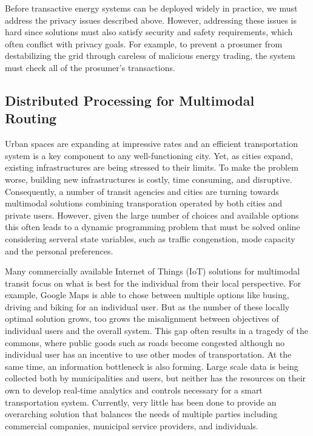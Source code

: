 \documentclass[12pt,letterpaper]{article}
\begin{document}
Before transactive energy systems can be deployed widely in practice,
we must address the privacy issues described above. However, addressing these
issues is hard since solutions must also satisfy security
and safety requirements, which often conflict with privacy goals.  For
example, to prevent a prosumer from destabilizing the grid through
careless of malicious energy trading, the system must check all of the
prosumer's transactions.  

\subsection{Distributed Processing for Multimodal Routing}

Urban spaces are expanding at impressive rates and an efficient transportation system is a key component to any well-functioning city. Yet, as cities expand, existing infrastructures are being stressed to their limits. To make the problem worse,  building new infrastructures is costly, time consuming, and disruptive. Consequently, a number of transit agencies and cities are turning towards multimodal  solutions combining transporation operated by both cities and private users. However, given the large number of choices and available options this often leads to a dynamic programming problem that must be solved online considering serveral state variables, such as traffic congenstion, mode capacity and the personal preferences. 

Many commercially available Internet of Things (IoT) solutions for multimodal
transit focus on what is best for the individual from their local perspective. For example, Google Maps is able to chose between multiple options like busing, driving and biking for an individual user. But as the number of these locally optimal solution grows, too grows the misalignment between objectives of individual users and the overall system. This gap often results in a tragedy of the commons, where public goods such as roads become congested although no individual user has an incentive to use other modes of transportation. At the same time, an information bottleneck is also forming. Large scale data is being collected both by municipalities and users, but neither has the resources on their own to develop real-time analytics and controls necessary for a smart transportation system. Currently, very little has been done to provide an overarching solution that balances the needs of multiple parties including commercial companies, municipal service providers, and individuals.
\end{document}
